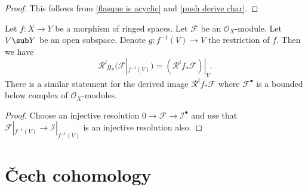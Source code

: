 \begin{proof}
This follows from \cref{flasque is acyclic} and \cref{push derive char}.
\end{proof}
\begin{proposition}
Let $f:X\to Y$ be a morphism of ringed spaces. Let $\mathscr{F}$ be an $\mathscr{O}_X$-module. Let $V\sub Y$ be an open subspace. Denote $g:f^{-1}(V)\to V$ the restriction of $f$. Then we have
\[\mathcal{R}^ig_*(\mathscr{F}|_{f^{-1}(V)})=(\mathcal{R}^if_*\mathscr{F})|_V.\]
There is a similar statement for the derived image $\mathcal{R}^if_*\mathscr{F}$ where $\mathscr{F}^\bullet$ is a bounded
below complex of $\mathscr{O}_X$-modules.
\end{proposition}
\begin{proof}
Choose an injective resolution $0\to\mathscr{F}\to\mathscr{I}^\bullet$ and use that $\mathscr{F}|_{f^{-1}(V)}\to\mathscr{I}|_{f^{-1}(V)}$ is an injective resolution also.
\end{proof}
\chapter{\v{C}ech cohomology}
